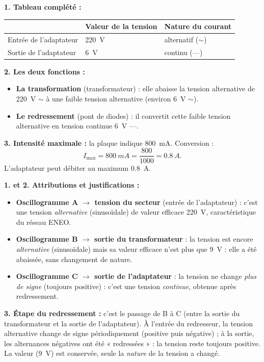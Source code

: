 \documentclass[11pt]{article}
\begin{document}
\begin{corrige}
\textbf{1. Tableau complété :}
\begin{center}
\begin{tabularx}{\linewidth}{|X|X|X|}
\hline
\rowcolor{popblueL} & Valeur de la tension & Nature du courant \\
\hline
Entrée de l'adaptateur & \SI{220}{V} & alternatif ($\sim$) \\
\hline
Sortie de l'adaptateur & \SI{6}{V} & continu ($\text{---}$) \\
\hline
\end{tabularx}
\end{center}

\textbf{2. Les deux fonctions :}
\begin{itemize}
\item \textbf{La transformation} (transformateur) : elle abaisse la tension alternative de \SI{220}{V} $\sim$ à une faible tension alternative (environ \SI{6}{V} $\sim$).
\item \textbf{Le redressement} (pont de diodes) : il convertit cette faible tension alternative en tension continue \SI{6}{V} $\text{---}$.
\end{itemize}

\textbf{3. Intensité maximale :} la plaque indique \SI{800}{mA}. Conversion :
\[
I_{\max} = \SI{800}{mA} = \frac{800}{1000} = \SI{0,8}{A}.
\]
L'adaptateur peut débiter au maximum \SI{0,8}{A}.
\end{corrige}

\begin{corrige}
\textbf{1. et 2. Attributions et justifications :}
\begin{itemize}
\item \textbf{Oscillogramme A $\rightarrow$ tension du secteur} (entrée de l'adaptateur) : c'est une tension \emph{alternative} (sinusoïdale) de valeur efficace \SI{220}{V}, caractéristique du réseau ENEO.
\item \textbf{Oscillogramme B $\rightarrow$ sortie du transformateur} : la tension est encore \emph{alternative} (sinusoïdale) mais sa valeur efficace n'est plus que \SI{9}{V} : elle a été abaissée, sans changement de nature.
\item \textbf{Oscillogramme C $\rightarrow$ sortie de l'adaptateur} : la tension ne change \emph{plus de signe} (toujours positive) : c'est une tension \emph{continue}, obtenue après redressement.
\end{itemize}

\textbf{3. Étape du redressement :} c'est le passage de B à C (entre la sortie du transformateur et la sortie de l'adaptateur). À l'entrée du redresseur, la tension alternative change de signe périodiquement (positive puis négative) ; à la sortie, les alternances négatives ont été « redressées » : la tension reste toujours positive. La valeur (\SI{9}{V}) est conservée, seule la \emph{nature} de la tension a changé.
\end{corrige}
\end{document}
